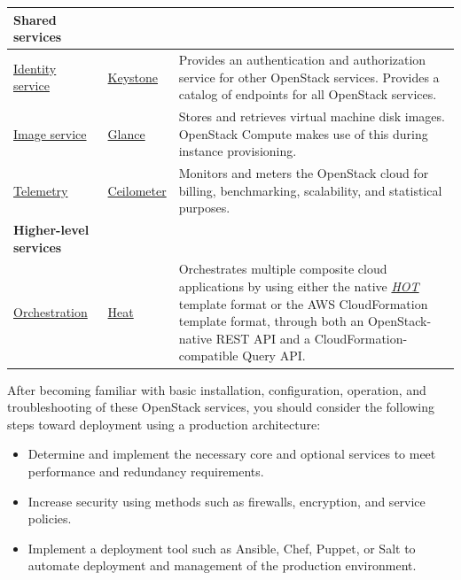 \documentclass[letterpaper,10pt,english]{sphinxmanual}
\begin{document}
\begin{threeparttable}
\begin{tabulary}{\linewidth}{|L|L|L|}
\hline
\textbf{Shared services}
 &  & \\
\hline
\href{http://www.openstack.org/software/releases/liberty/components/keystone}{Identity service}
 & 
\href{http://docs.openstack.org/developer/keystone/}{Keystone}
 & 
Provides an authentication and authorization service
for other OpenStack services. Provides a catalog of endpoints
for all OpenStack services.
\\
\hline
\href{http://www.openstack.org/software/releases/liberty/components/glance}{Image service}
 & 
\href{http://docs.openstack.org/developer/glance/}{Glance}
 & 
Stores and retrieves virtual machine disk images.
OpenStack Compute makes use of this during instance
provisioning.
\\
\hline
\href{http://www.openstack.org/software/releases/liberty/components/ceilometer}{Telemetry}
 & 
\href{http://docs.openstack.org/developer/ceilometer/}{Ceilometer}
 & 
Monitors and meters the OpenStack cloud for billing, benchmarking,
scalability, and statistical purposes.
\\
\hline
\textbf{Higher-level services}
 &  & \\
\hline
\href{http://www.openstack.org/software/releases/liberty/components/heat}{Orchestration}
 & 
\href{http://docs.openstack.org/developer/heat/}{Heat}
 & 
Orchestrates multiple composite cloud applications by using
either the native {\hyperref[_source/glossary:term-heat-orchestration-template-hot]{\emph{HOT}}} template
format or the AWS CloudFormation template format, through both an
OpenStack-native REST API and a CloudFormation-compatible
Query API.
\\
\hline\end{tabulary}

\end{threeparttable}


\begin{DUlineblock}{0em}
\item[] 
\end{DUlineblock}

After becoming familiar with basic installation, configuration, operation,
and troubleshooting of these OpenStack services, you should consider the
following steps toward deployment using a production architecture:
\begin{itemize}
\item {} 
Determine and implement the necessary core and optional services to
meet performance and redundancy requirements.

\item {} 
Increase security using methods such as firewalls, encryption, and
service policies.

\item {} 
Implement a deployment tool such as Ansible, Chef, Puppet, or Salt
to automate deployment and management of the production environment.

\end{itemize}
\end{document}
